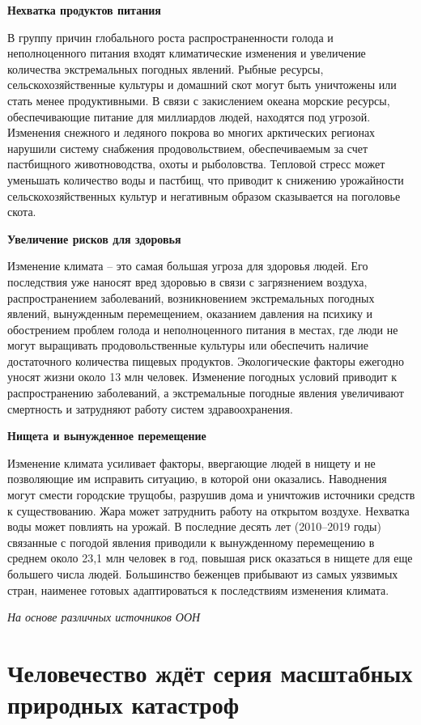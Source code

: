 \textbf{Нехватка продуктов питания}

В группу причин глобального роста распространенности голода и неполноценного питания входят климатические изменения и увеличение количества экстремальных погодных явлений. Рыбные ресурсы, сельскохозяйственные культуры и домашний скот могут быть уничтожены или стать менее продуктивными. В связи с закислением океана морские ресурсы, обеспечивающие питание для миллиардов людей, находятся под угрозой. Изменения снежного и ледяного покрова во многих арктических регионах нарушили систему снабжения продовольствием, обеспечиваемым за счет пастбищного животноводства, охоты и рыболовства. Тепловой стресс может уменьшать количество воды и пастбищ, что приводит к снижению урожайности сельскохозяйственных культур и негативным образом сказывается на поголовье скота.

\textbf{Увеличение рисков для здоровья}

Изменение климата – это самая большая угроза для здоровья людей. Его последствия уже наносят вред здоровью в связи с загрязнением воздуха, распространением заболеваний, возникновением экстремальных погодных явлений, вынужденным перемещением, оказанием давления на психику и обострением проблем голода и неполноценного питания в местах, где люди не могут выращивать продовольственные культуры или обеспечить наличие достаточного количества пищевых продуктов. Экологические факторы ежегодно уносят жизни около 13 млн человек. Изменение погодных условий приводит к распространению заболеваний, а экстремальные погодные явления увеличивают смертность и затрудняют работу систем здравоохранения.

\textbf{Нищета и вынужденное перемещение}

Изменение климата усиливает факторы, ввергающие людей в нищету и не позволяющие им исправить ситуацию, в которой они оказались. Наводнения могут смести городские трущобы, разрушив дома и уничтожив источники средств к существованию. Жара может затруднить работу на открытом воздухе. Нехватка воды может повлиять на урожай. В последние десять лет (2010–2019 годы) связанные с погодой явления приводили к вынужденному перемещению в среднем около 23,1 млн человек в год, повышая риск оказаться в нищете для еще большего числа людей. Большинство беженцев прибывают из самых уязвимых стран, наименее готовых адаптироваться к последствиям изменения климата.

\textit{На основе различных источников ООН}

\newpage
\section{Человечество ждёт серия масштабных природных катастроф}

